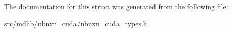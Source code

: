 \-The documentation for this struct was generated from the following file\-:\begin{DoxyCompactItemize}
\item 
src/mdlib/nbnxn\-\_\-cuda/\hyperlink{nbnxn__cuda__types_8h}{nbnxn\-\_\-cuda\-\_\-types.\-h}\end{DoxyCompactItemize}
